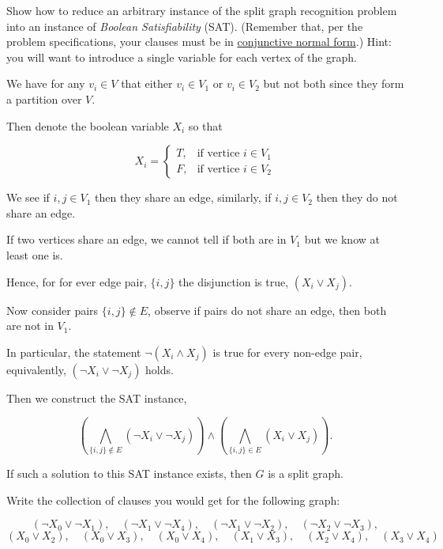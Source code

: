 \begin{questions}
	\question[4] Show how  to reduce an arbitrary  instance of the split  graph recognition problem
	into  an instance  of  \emph {Boolean  Satisfiability}  (SAT). (Remember that, per the problem specifications, your clauses must be in \href{https://en.wikipedia.org/wiki/Conjunctive_normal_form}{conjunctive normal form}.) Hint:  you  will want  to
	introduce a single variable for each vertex of the graph.

	\begin{soln}
		We have for any \(v_i \in V\) that either \(v_i \in V_1\) or \(v_i \in V_2\) but not both since they form a partition over \(V\).

		Then denote the boolean variable \(X_i\) so that

		\[
			X_i =
			\begin{cases}
				T, & \text{if vertice } i \in V_1 \\
				F, & \text{if vertice } i \in V_2
			\end{cases}
		\]

		We see if \(i, j \in V_1\) then they share an edge, similarly, if \(i, j \in V_2\) then they do not share an edge.

		If two vertices share an edge, we cannot tell if both are in \(V_1\) but we know at least one is.

		Hence, for for ever edge pair, \(\{i, j\}\) the disjunction is true, \((X_i \lor X_j)\).

		Now consider pairs \(\{i, j\} \notin E\), observe if pairs do not share an edge, then both are not in \(V_1\).

		In particular, the statement \(\lnot (X_i \land X_j )\) is true for every non-edge pair, equivalently, \((\lnot X_i \lor \lnot X_j)\) holds.

		Then we construct the SAT instance,

		\[
			\left(\bigwedge_{\{i, j\} \notin E}  (\lnot X_i \lor \lnot X_j)\right) \land \left(\bigwedge_{\{i, j\} \in E}(X_i \lor X_j)\right).
		\]

		If such a solution to this SAT instance exists, then \(G\) is a split graph.
	\end{soln}

	\ifsolutions\fi

	\question[1] Write the collection of clauses you would get for the following graph:

	\begin{soln}
		\[
			(\lnot X_0 \lor \lnot X_1), \quad (\lnot X_1 \lor \lnot X_4), \quad
			(\lnot X_1 \lor \lnot X_2), \quad (\lnot X_2 \lor \lnot X_3),
		\]
		\[
			(X_0 \lor  X_2), \quad
			(X_0 \lor  X_3), \quad
			(X_0 \lor  X_4), \quad
			(X_1 \lor  X_3), \quad
			(X_2 \lor  X_4), \quad
			(X_3 \lor  X_4)
		\]
	\end{soln}


\end{questions}
